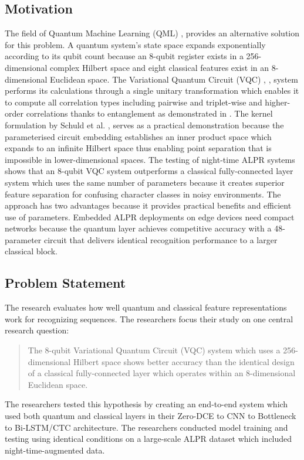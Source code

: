 \documentclass{ieeeaccess}
\begin{document}
\subsection{Motivation}
The field of Quantum Machine Learning (QML) \cite{b9}, \cite{b10} provides an alternative solution for this problem. A quantum system's state space expands exponentially according to its qubit count because an 8-qubit register exists in a 256-dimensional complex Hilbert space and eight classical features exist in an 8-dimensional Euclidean space. The Variational Quantum Circuit (VQC) \cite{b10}, \cite{b22}, \cite{b24} system performs its calculations through a single unitary transformation which enables it to compute all correlation types including pairwise and triplet-wise and higher-order correlations thanks to entanglement as demonstrated in \cite{b9}. The kernel formulation by Schuld et al. \cite{b5}, \cite{b35} serves as a practical demonstration because the parameterised circuit embedding establishes an inner product space which expands to an infinite Hilbert space thus enabling point separation that is impossible in lower-dimensional spaces. The testing of night-time ALPR systems shows that an 8-qubit VQC system outperforms a classical fully-connected layer system which uses the same number of parameters because it creates superior feature separation for confusing character classes in noisy environments. The approach has two advantages because it provides practical benefits and efficient use of parameters. Embedded ALPR deployments on edge devices need compact networks because the quantum layer achieves competitive accuracy with a 48-parameter circuit that delivers identical recognition performance to a larger classical block.

\subsection{Problem Statement}
The research evaluates how well quantum and classical feature representations work for recognizing sequences. The researchers focus their study on one central research question:

\begin{quote}
The 8-qubit Variational Quantum Circuit (VQC) system which uses a 256-dimensional Hilbert space shows better accuracy than the identical design of a classical fully-connected layer which operates within an 8-dimensional Euclidean space.
\end{quote}

The researchers tested this hypothesis by creating an end-to-end system which used both quantum and classical layers in their Zero-DCE to CNN to Bottleneck to Bi-LSTM/CTC architecture. The researchers conducted model training and testing using identical conditions on a large-scale ALPR dataset which included night-time-augmented data.
\end{document}
